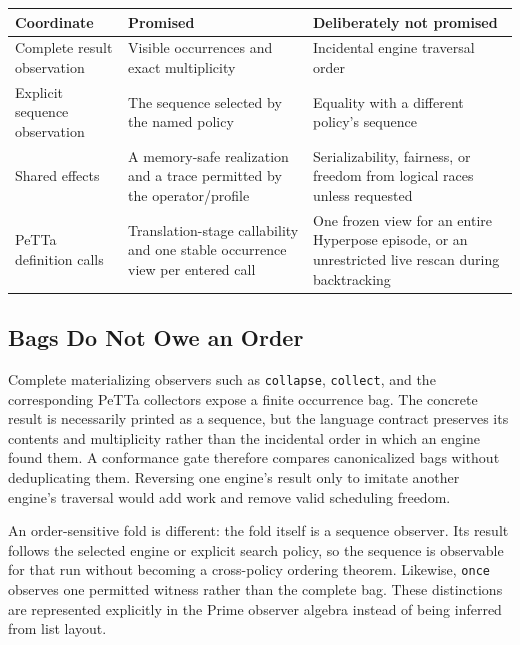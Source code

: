 \documentclass[11pt]{article}
\newcommand{\code}[1]{\texttt{#1}}
\newcommand{\PeTTa}{\textup{PeTTa}}
\begin{document}
\begin{center}
\begin{tabular}{>{\raggedright\arraybackslash}p{}
                >{\raggedright\arraybackslash}p{}
                >{\raggedright\arraybackslash}p{}}
\toprule
Coordinate & Promised & Deliberately not promised \\
\midrule
Complete result observation & Visible occurrences and exact multiplicity &
  Incidental engine traversal order \\
Explicit sequence observation & The sequence selected by the named policy &
  Equality with a different policy's sequence \\
Shared effects & A memory-safe realization and a trace permitted by the
  operator/profile & Serializability, fairness, or freedom from logical
  races unless requested \\
\PeTTa{} definition calls & Translation-stage callability and one stable
  occurrence view per entered call & One frozen view for an entire
  Hyperpose episode, or an unrestricted live rescan during backtracking \\
\bottomrule
\end{tabular}
\end{center}

\subsection{Bags Do Not Owe an Order}

Complete materializing observers such as \code{collapse}, \code{collect},
and the corresponding \PeTTa{} collectors expose a finite occurrence bag.
The concrete result is necessarily printed as a sequence, but the language
contract preserves its contents and multiplicity rather than the incidental
order in which an engine found them.  A conformance gate therefore compares
canonicalized bags without deduplicating them.  Reversing one engine's result
only to imitate another engine's traversal would add work and remove valid
scheduling freedom.

An order-sensitive fold is different: the fold itself is a sequence observer.
Its result follows the selected engine or explicit search policy, so the
sequence is observable for that run without becoming a cross-policy ordering
theorem.  Likewise, \code{once} observes one permitted witness rather than
the complete bag.  These distinctions are represented explicitly in the
Prime observer algebra instead of being inferred from list layout.
\end{document}
